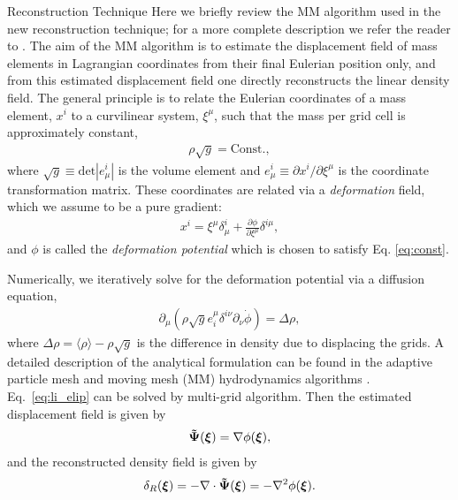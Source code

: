 \begin{section}{Reconstruction Technique}
  \label{sec:reconstruction}
  Here we briefly review the MM algorithm used in the new reconstruction technique; for a more
  complete description we refer the reader to \cite{bib:ZhuH2016}.  
  The aim of the MM algorithm is to estimate the displacement field of mass elements in 
  Lagrangian coordinates from their final Eulerian position only, and from this
  estimated displacement field one directly reconstructs the linear density field. The
  general principle is to relate the Eulerian coordinates of a mass element, $x^i$ to
  a curvilinear system, $\xi^\mu$, such that the mass
  per grid cell is approximately constant,
  \begin{align}
   \label{eq:const}
    \rho \sqrt{g}=\mathrm{Const.},
  \end{align}
  where $\sqrt{g} \equiv \mathrm{det}\left| e^i_\mu\right|$ is the volume
  element and $e^i_\mu \equiv \partial x^i / \partial \xi ^ \mu$ is the coordinate transformation matrix. 
  These coordinates are
  related via a {\it deformation} field, which we assume to be a pure
  gradient:
  \begin{align}
    x^i = \xi^\mu \delta^i_\mu + \frac{\partial \phi}{\partial
    \xi^\mu}\delta^{i\mu},
  \end{align}
  and $\phi$ is called the {\it deformation potential} which is chosen to satisfy Eq. \ref{eq:const}.  

  Numerically, we iteratively solve for
  the deformation potential via a diffusion equation, 
  \begin{align}
    \label{eq:li_elip}
    \partial _\mu (\rho \sqrt{g} e^\mu _i \delta^{i\nu}
    \partial_\nu \dot{\phi})=\Delta \rho,
  \end{align}
  where $\Delta \rho = \langle\rho\rangle-\rho \sqrt{g}$ is the difference in density 
  due to displacing the grids. A detailed description 
  of the analytical formulation can be found in the adaptive
  particle mesh and moving mesh (MM) hydrodynamics algorithms \cite{bib:Pen1995,bib:Pen1998}.
  Eq.~\ref{eq:li_elip} can be solved by multi-grid
  algorithm\cite{bib:Pen1995,bib:Pen1998,bib:ZhuH2016}.
  Then the estimated displacement field is given by
  \begin{align}
   \label{eq:disp}
   \boldsymbol{\tilde{\Psi}}(\boldsymbol{\xi})=\nabla \phi(\boldsymbol{\xi}),
  \end{align}
  and the reconstructed density field is given by
  \begin{align}
   \label{eq:delta}
   \delta_R(\boldsymbol{\xi})=- \nabla \cdot \boldsymbol{\tilde{\Psi}}(\boldsymbol{\xi}) = - \nabla^2 \phi(\boldsymbol{\xi}). 
  \end{align}

\end{section}

